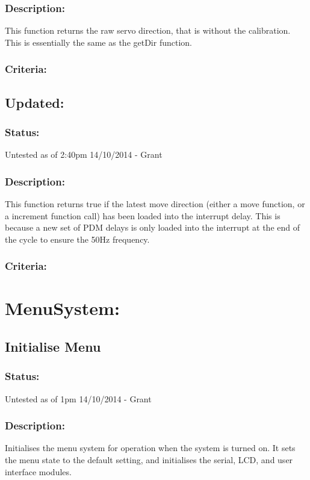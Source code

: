 \documentclass[]{report}
\begin{document}
\subsubsection{Description:}
This function returns the raw servo direction, that is without the calibration. This is essentially the same as the getDir function.

\subsubsection{Criteria:}

\subsection{Updated:}
\subsubsection{Status:}
Untested as of 2:40pm 14/10/2014 - Grant

\subsubsection{Description:}
This function returns true if the latest move direction (either a move function, or a increment function call) has been loaded into the interrupt delay. This is because a new set of PDM delays is only loaded into the interrupt at the end of the cycle to ensure the 50Hz frequency.

\subsubsection{Criteria:}



\newpage
\section{MenuSystem:}
\subsection{Initialise Menu}
\subsubsection{Status:}
Untested as of 1pm 14/10/2014 - Grant

\subsubsection{Description:}
Initialises the menu system for operation when the system is turned on. It sets the menu state to the default setting, and initialises the serial, LCD, and user interface modules.
\end{document}

